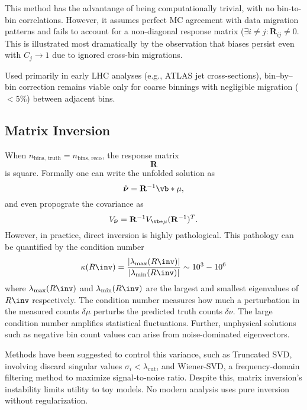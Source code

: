 This method has the advantange of being computationally trivial, with no bin-to-bin correlations.
%
However, it assumes perfect MC agreement with data migration patterns and fails to account for a non-diagonal response matrix (\(\exists i \neq j: \mathbf{R}_{ij} \ne 0\).
%
This is illustrated most dramatically by the observation that biases persist even with \(C_j \rightarrow 1\) due to ignored cross-bin migrations.

Used primarily in early LHC analyses (e.g., ATLAS jet cross-sections), bin--by--bin correction remains viable only for coarse binnings with negligible migration (\(<5\%\)) between adjacent bins.

\subsection{Matrix Inversion}  
When \(n_{\text{bins, truth}} = n_{\text{bins, reco}}\), the response matrix $$\mathbf{R}$$ is square.
%
Formally one can write the unfolded solution as  
\begin{equation}
    \hat{\boldsymbol{\nu}} = \mathbf{R}^{-1}\vb*{\mu},
\end{equation}  
and even propograte the covariance as  
\begin{equation}
    V_{\hat{\boldsymbol{\nu}}} = \mathbf{R}^{-1} V_{\vb*{\mu}} (\mathbf{R}^{-1})^T.
\end{equation}  
However, in practice, direct inversion is highly pathological.
%
This pathology can be quantified by the condition number
\begin{equation}
    \kappa(R\inv) = \frac{|\lambda_{\mathrm{max}}(R\inv)|}{|\lambda_{\mathrm{min}}(R\inv)|} \sim 10^3 - 10^6
\end{equation}
where $\lambda_{\mathrm{max}}(R\inv)$ and $\lambda_{\mathrm{min}}(R\inv)$ are the largest and smallest eigenvalues of $R\inv$ respectively.
%
The condition number measures how much a perturbation in the measured counts $\delta\mu$ perturbs the predicted truth counts $\delta\nu$.
%
The large condition number amplifies statistical fluctuations.
Further, unphysical solutions such as negative bin count values can arise from noise-dominated eigenvectors.

Methods have been suggested to control this variance, such as Truncated SVD, involving discard singular values \(\sigma_i < \lambda_{\text{cut}}\), and Wiener-SVD, a frequency-domain filtering method to maximize signal-to-noise ratio.
%
Despite this, matrix inversion's instability limits utility to toy models.
%
No modern analysis uses pure inversion without regularization.

